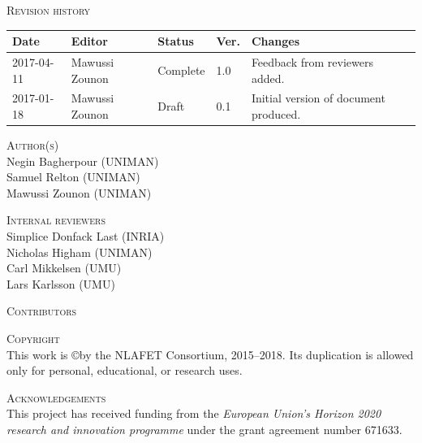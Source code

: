 \documentclass[a4paper,12pt]{article}
\begin{document}
\vspace{2em}


\noindent
\textsc{Revision history}\\[1em]
\begin{tabularx}{\linewidth}{@{}|l|l|l|l|X|}
  \hline
  \rowcolor{orange}
  \bf Date & \bf Editor & \bf Status & \bf Ver. & \bf Changes \\
  \hline
  2017-04-11 & Mawussi Zounon & Complete & 1.0 & Feedback from
                                                reviewers added.\\
  2017-01-18 & Mawussi Zounon & Draft & 0.1 & Initial version of
                                             document produced. \\
  \hline
\end{tabularx}


\vspace{2em}


\noindent
\textsc{Author(s)}\\[1em]
Negin Bagherpour (UNIMAN)\\
Samuel Relton (UNIMAN)\\
Mawussi Zounon (UNIMAN)
\vspace{2em}

\noindent
\textsc{Internal reviewers}\\[1em]
Simplice Donfack Last (INRIA)\\
Nicholas Higham (UNIMAN)\\
Carl Mikkelsen (UMU)\\
Lars Karlsson (UMU)

\vspace{2em}




\noindent
\textsc{Contributors}\\[1em]

\vspace{2em}

\noindent
\textsc{Copyright}\\[1em]
This work is \copyright by the NLAFET Consortium, 2015--2018.
Its duplication is allowed only for personal, educational, or research uses.

\vspace{2em}


\noindent
\textsc{Acknowledgements}\\[1em] This project has received funding
from the \emph{European Union's Horizon 2020 research and innovation
  programme} under the grant agreement number 671633.
\end{document}
